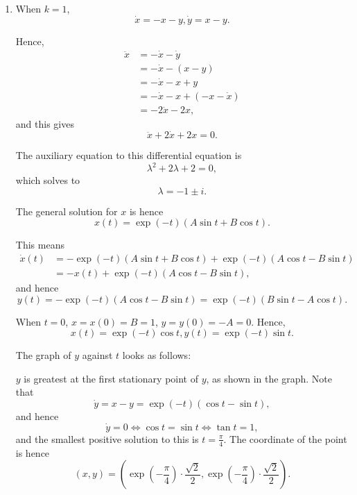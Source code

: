 \Question{\currfilebase}

\begin{enumerate}
    \item When \(k = 1\),
          \[
              \dot{x} = -x - y, \dot{y} = x - y.
          \]

          Hence,
          \begin{align*}
              \ddot{x} & = - \dot{x} - \dot{y}           \\
                       & = - \dot{x} - (x - y)           \\
                       & = -\dot{x} - x + y              \\
                       & = -\dot{x} - x + (-x - \dot{x}) \\
                       & = -2\dot{x} - 2x,
          \end{align*}
          and this gives
          \[
              \ddot{x} + 2\dot{x} + 2x = 0.
          \]

          The auxiliary equation to this differential equation is
          \[
              \lambda^2 + 2\lambda + 2 = 0,
          \]
          which solves to
          \[
              \lambda = -1 \pm i.
          \]

          The general solution for \(x\) is hence
          \[
              x(t) = \exp(-t) \left(A \sin t + B \cos t\right).
          \]

          This means
          \begin{align*}
              \dot{x}(t) & = - \exp(-t) \left(A \sin t + B \cos t\right) + \exp(-t) \left(A \cos t - B \sin t\right) \\
                         & = -x(t) + \exp(-t) \left(A \cos t - B \sin t\right),
          \end{align*}
          and hence
          \[
              y(t) = - \exp(-t) \left(A \cos t - B \sin t\right) = \exp(-t) \left(B \sin t - A \cos t\right).
          \]

          When \(t = 0\), \(x = x(0) = B = 1\), \(y = y(0) = -A = 0\). Hence,
          \[
              x(t) = \exp(-t) \cos t, y(t) = \exp(-t) \sin t.
          \]

          The graph of \(y\) against \(t\) looks as follows:
          \begin{center}
              
          \end{center}

          \(y\) is greatest at the first stationary point of \(y\), as shown in the graph. Note that
          \[
              \dot{y} = x - y = \exp(-t) \left(\cos t - \sin t\right),
          \]
          and hence
          \[
              \dot{y} = 0 \iff \cos t = \sin t \iff \tan t = 1,
          \]
          and the smallest positive solution to this is \(t = \frac{\pi}{4}\). The coordinate of the point is hence
          \[
              (x, y) = \left(\exp\left(-\frac{\pi}{4}\right) \cdot \frac{\sqrt{2}}{2}, \exp\left(-\frac{\pi}{4}\right) \cdot \frac{\sqrt{2}}{2}\right).
          \]


\end{enumerate}
